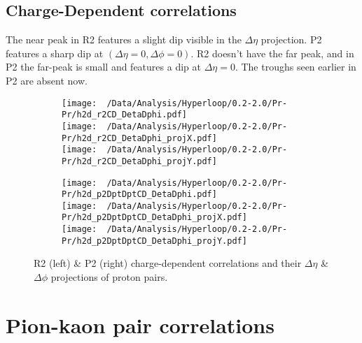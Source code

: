 \documentclass[12pt,a4paper,twoside]{report}
\begin{document}
\subsection{Charge-Dependent correlations}
The near peak in R2 features a slight dip visible in the $\Delta\eta$ projection. P2 features a sharp dip at $(\Delta\eta=0,\Delta\phi=0)$. R2 doesn't have the far peak, and in P2 the far-peak is small and features a dip at $\Delta\eta=0$. The troughs seen earlier in P2 are absent now.
\begin{figure}[H]
	\begin{subfigure}{0.49\linewidth}
		\texttt{[image: ~/Data/Analysis/Hyperloop/0.2-2.0/Pr-Pr/h2d\_r2CD\_DetaDphi.pdf]}\\
		\texttt{[image: ~/Data/Analysis/Hyperloop/0.2-2.0/Pr-Pr/h2d\_r2CD\_DetaDphi\_projX.pdf]}\\
		\texttt{[image: ~/Data/Analysis/Hyperloop/0.2-2.0/Pr-Pr/h2d\_r2CD\_DetaDphi\_projY.pdf]}\\
	\end{subfigure}
	\begin{subfigure}{0.49\linewidth}
		\texttt{[image: ~/Data/Analysis/Hyperloop/0.2-2.0/Pr-Pr/h2d\_p2DptDptCD\_DetaDphi.pdf]}\\
		\texttt{[image: ~/Data/Analysis/Hyperloop/0.2-2.0/Pr-Pr/h2d\_p2DptDptCD\_DetaDphi\_projX.pdf]}\\
		\texttt{[image: ~/Data/Analysis/Hyperloop/0.2-2.0/Pr-Pr/h2d\_p2DptDptCD\_DetaDphi\_projY.pdf]}\\
	\end{subfigure}
	\caption{R2 (left) \& P2 (right) charge-dependent correlations and their $\Delta\eta$ \& $\Delta\phi$ projections of proton pairs.}
\end{figure}
\section{Pion-kaon pair correlations}
\end{document}
